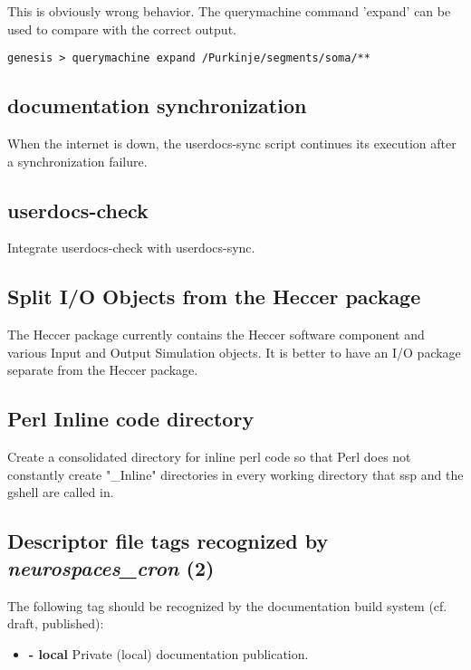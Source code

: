 \documentclass[12pt]{article}
\begin{document}
This is obviously wrong behavior.  The querymachine command 'expand'
can be used to compare with the correct output.

\begin{verbatim}
genesis > querymachine expand /Purkinje/segments/soma/**
\end{verbatim}


\subsection{documentation synchronization}

When the internet is down, the userdocs-sync script continues its
execution after a synchronization failure.


\subsection{userdocs-check}

Integrate userdocs-check with userdocs-sync.


\subsection{Split I/O Objects from the Heccer package}

The Heccer package currently contains the Heccer software component
and various Input and Output Simulation objects.  It is better to have
an I/O package separate from the Heccer package.


\subsection{Perl Inline code directory}

Create a consolidated directory for inline perl code so that Perl does not 
constantly create "\_Inline" directories in every working directory
that ssp and the gshell are called in. 

\subsection{Descriptor file tags recognized by {\it neurospaces\_cron} (2)}

The following tag should be recognized by the documentation build
system (cf. draft, published):
\begin{itemize}
    \item[]{\bf - local} Private (local) documentation publication.
\end{itemize}
\end{document}

